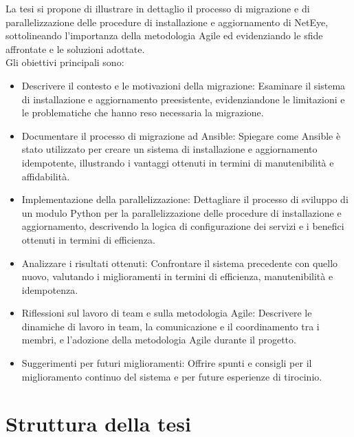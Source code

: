 La tesi si propone di illustrare in dettaglio il processo di migrazione e di parallelizzazione
delle procedure di installazione e aggiornamento di NetEye, sottolineando l'importanza
della metodologia Agile ed evidenziando le sfide affrontate e le soluzioni
adottate.\\ Gli obiettivi principali sono:
\begin{itemize}
  \item Descrivere il contesto e le motivazioni della migrazione: Esaminare il
    sistema di installazione e aggiornamento preesistente, evidenziandone le limitazioni
    e le problematiche che hanno reso necessaria la migrazione.

  \item Documentare il processo di migrazione ad Ansible: Spiegare come Ansible
    è stato utilizzato per creare un sistema di installazione e aggiornamento
    idempotente, illustrando i vantaggi ottenuti in termini di manutenibilità e affidabilità.

  \item Implementazione della parallelizzazione: Dettagliare il processo di
    sviluppo di un modulo Python per la parallelizzazione delle procedure di
    installazione e aggiornamento, descrivendo la logica di configurazione dei servizi
    e i benefici ottenuti in termini di efficienza.

  \item Analizzare i risultati ottenuti: Confrontare il sistema precedente con
    quello nuovo, valutando i miglioramenti in termini di efficienza,
    manutenibilità e idempotenza.

  \item Riflessioni sul lavoro di team e sulla metodologia Agile: Descrivere le
    dinamiche di lavoro in team, la comunicazione e il coordinamento tra i membri,
    e l'adozione della metodologia Agile durante il progetto.

  \item Suggerimenti per futuri miglioramenti: Offrire spunti e consigli per il
    miglioramento continuo del sistema e per future esperienze di tirocinio.
\end{itemize}

\section{Struttura della tesi}
\label{sec:struttura}

